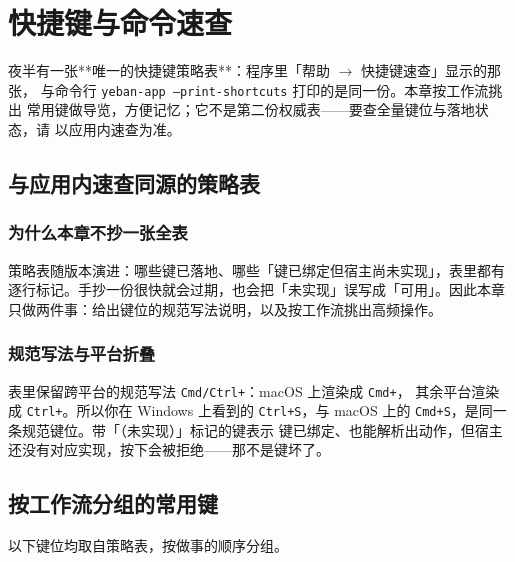 
\chapter{快捷键与命令速查}
\label{ch:shortcuts}






夜半有一张**唯一的快捷键策略表**：程序里「帮助 $\to$ 快捷键速查」显示的那张，
与命令行 \texttt{yeban-app --print-shortcuts} 打印的是同一份。本章按工作流挑出
常用键做导览，方便记忆；它不是第二份权威表——要查全量键位与落地状态，请
以应用内速查为准。

\section{与应用内速查同源的策略表}

\subsection{为什么本章不抄一张全表}

策略表随版本演进：哪些键已落地、哪些「键已绑定但宿主尚未实现」，表里都有
逐行标记。手抄一份很快就会过期，也会把「未实现」误写成「可用」。因此本章
只做两件事：给出键位的规范写法说明，以及按工作流挑出高频操作。

\subsection{规范写法与平台折叠}

表里保留跨平台的规范写法 \texttt{Cmd/Ctrl+}：macOS 上渲染成 \texttt{Cmd+}，
其余平台渲染成 \texttt{Ctrl+}。所以你在 Windows 上看到的 \texttt{Ctrl+S}，与
macOS 上的 \texttt{Cmd+S}，是同一条规范键位。带「（未实现）」标记的键表示
键已绑定、也能解析出动作，但宿主还没有对应实现，按下会被拒绝——那不是键坏了。

\section{按工作流分组的常用键}

以下键位均取自策略表，按做事的顺序分组。

